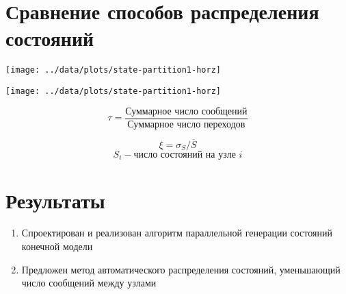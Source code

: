 \documentclass[12pt]{article}
\begin{document}
\section{Сравнение способов распределения состояний}
\label{sec:partition-cmp}

\begin{minipage}[m]{0.5\linewidth}
  \texttt{[image: ../data/plots/state-partition1-horz]}  
\end{minipage}
\begin{minipage}[m]{0.5\linewidth}
  \texttt{[image: ../data/plots/state-partition1-horz]}  
\end{minipage}

\small{
  \begin{minipage}[m]{0.5\linewidth}
    $$ \tau = \frac{\text{Суммарное число сообщений}}{\text{Суммарное число переходов}} $$    
  \end{minipage}
  \begin{minipage}[m]{0.5\linewidth}
    $$ \xi = \sigma_S/\overline{S}$$ $$ S_i - \text{число состояний на узле~} i $$
  \end{minipage}
}

\section{Результаты}
\label{sec:conclusion}

\small
\begin{enumerate}
\item Спроектирован и реализован алгоритм параллельной генерации состояний конечной
  модели
\item Предложен метод автоматического распределения состояний, уменьшающий число сообщений
  между узлами
\end{enumerate}
\end{document}
